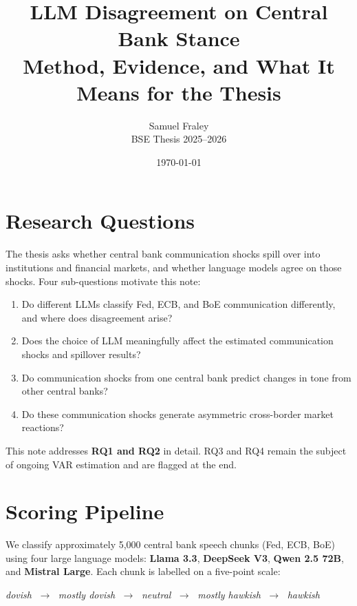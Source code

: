 \documentclass[11pt,a4paper]{article}
\title{\textbf{LLM Disagreement on Central Bank Stance}\\[0.4em]
       \large Method, Evidence, and What It Means for the Thesis}
\author{Samuel Fraley \\ BSE Thesis 2025--2026}
\date{\today}
\begin{document}
\maketitle
\tableofcontents
\vspace{1em}

\section{Research Questions}

The thesis asks whether central bank communication shocks spill over into
institutions and financial markets, and whether language models agree on those
shocks. Four sub-questions motivate this note:

\begin{enumerate}
  \item Do different LLMs classify Fed, ECB, and BoE communication differently,
        and where does disagreement arise?
  \item Does the choice of LLM meaningfully affect the estimated communication
        shocks and spillover results?
  \item Do communication shocks from one central bank predict changes in tone
        from other central banks?
  \item Do these communication shocks generate asymmetric cross-border market
        reactions?
\end{enumerate}

This note addresses \textbf{RQ1 and RQ2} in detail. RQ3 and RQ4 remain
the subject of ongoing VAR estimation and are flagged at the end.

\section{Scoring Pipeline}

We classify approximately 5,000 central bank speech chunks (Fed, ECB, BoE)
using four large language models: \textbf{Llama 3.3}, \textbf{DeepSeek V3},
\textbf{Qwen 2.5 72B}, and \textbf{Mistral Large}. Each chunk is labelled on
a five-point scale:

\begin{center}
\textit{dovish} $\;\longrightarrow\;$
\textit{mostly dovish} $\;\longrightarrow\;$
\textit{neutral} $\;\longrightarrow\;$
\textit{mostly hawkish} $\;\longrightarrow\;$
\textit{hawkish}
\end{center}
\end{document}
